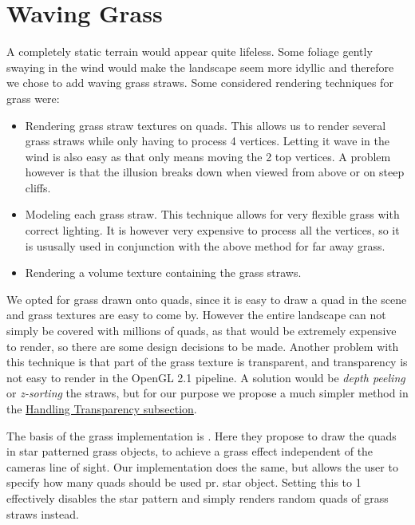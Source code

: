 \chapter{Waving Grass}


A completely static terrain would appear quite lifeless. Some foliage
gently swaying in the wind would make the landscape seem more idyllic
and therefore we chose to add waving grass straws. Some considered
rendering techniques for grass were:

\begin{itemize}
\item Rendering grass straw textures on quads. This allows us to
  render several grass straws while only having to process 4
  vertices. Letting it wave in the wind is also easy as that only
  means moving the 2 top vertices. A problem however is that the
  illusion breaks down when viewed from above or on steep cliffs.
\item Modeling each grass straw. This technique allows for very
  flexible grass with correct lighting. It is however very expensive
  to process all the vertices, so it is ususally used in conjunction
  with the above method for far away grass.
\item Rendering a volume texture containing the grass straws.
\end{itemize}

We opted for grass drawn onto quads, since it is easy to draw a quad
in the scene and grass textures are easy to come by. However the
entire landscape can not simply be covered with millions of quads, as
that would be extremely expensive to render, so there are some design
decisions to be made. Another problem with this technique is that part
of the grass texture is transparent, and transparency is not easy to
render in the OpenGL 2.1 pipeline. A solution would be \emph{depth
  peeling} or \emph{z-sorting} the straws, but for our purpose we
propose a much simpler method in the
\hyperref[sec:transparency]{Handling Transparency subsection}.

The basis of the grass implementation is
. Here they propose to draw the quads in
star patterned grass objects, to achieve a grass effect independent of
the cameras line of sight. Our implementation does the same, but
allows the user to specify how many quads should be used pr. star
object. Setting this to 1 effectively disables the star pattern and
simply renders random quads of grass straws instead.

